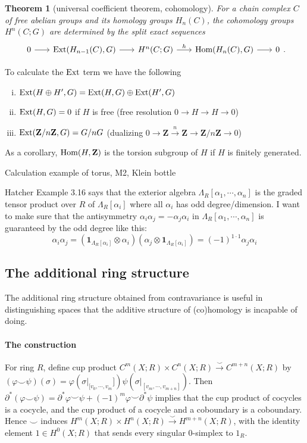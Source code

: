 \documentclass[11pt]{article}
\theoremstyle{definition}
\theoremstyle{plain}
\newtheorem{theorem}{Theorem}[section]
\newcommand{\Z}{\mathbf{Z}}
\newcommand{\Hom}{\textup{Hom}}
\newcommand{\Ext}{\textup{Ext}}
\newcommand{\1}{\mathbf{1}}
\begin{document}
\begin{theorem}[universal coefficient theorem, cohomology]
For a chain complex $C$ of free abelian groups and its homology groups $H_n(C)$, the cohomology groups $H^n(C;G)$ are determined by the split exact sequences
\begin{equation}\begin{tikzcd}[column sep=scriptsize]
0\arrow[r]&\Ext(H_{n-1}(C),G)\arrow[r]&H^n(C;G)\arrow{r}{h}&\Hom(H_n(C),G)\arrow[r]&0
\end{tikzcd}.\end{equation}
\end{theorem}

To calculate the $\Ext$ term we have the following\begin{enumerate}[(i)]
    \item $\Ext(H\oplus H',G)=\Ext(H,G)\oplus\Ext(H',G)$
    \item $\Ext(H,G)=0$ if $H$ is free (free resolution $0\rightarrow H\rightarrow H\rightarrow0$)
    \item $\Ext(\Z/n\Z,G)=G/nG$ (dualizing $0\rightarrow\Z\xrightarrow{n}\Z\rightarrow\Z/n\Z\rightarrow0$)
\end{enumerate}
As a corollary, $\Hom(H,\Z)$ is the torsion subgroup of $H$ if $H$ is finitely generated.

Calculation example of torus, M2, Klein bottle\bigbreak

Hatcher Example 3.16 says that the exterior algebra $\Lambda_R[\alpha_1,\cdots,\alpha_n]$ is the graded tensor product over $R$ of $\Lambda_R[\alpha_i]$ where all $\alpha_i$ has odd degree/dimension. I want to make sure that the antisymmetry $\alpha_i\alpha_j=-\alpha_j\alpha_i$ in $\Lambda_R[\alpha_1,\cdots,\alpha_n]$ is guaranteed by the odd degree like this:
\[\alpha_i\alpha_j=(\1_{\Lambda_R[\alpha_i]}\otimes\alpha_i)(\alpha_j\otimes\1_{\Lambda_R[\alpha_i]})=(-1)^{1\cdot1}\alpha_j\alpha_i\]

\newpage
\subsection{The additional ring structure}

The additional ring structure obtained from contravariance is useful in distinguishing spaces that the additive structure of (co)homology is incapable of doing.

\paragraph{The construction} For ring $R$, define cup product $C^m(X;R)\times C^n(X;R)\xrightarrow{\smile} C^{m+n}(X;R)$ by $(\varphi\smile\psi)(\sigma)=\varphi(\sigma|_{[v_0,\cdots,v_m}])\psi(\sigma|_{[v_m,\cdots,v_{m+n}]})$. Then $\partial^\ast(\varphi\smile\psi)=\partial^\ast\varphi\smile\psi+(-1)^m\varphi\smile\partial^\ast\psi$ implies that the cup product of cocycles is a cocycle, and the cup product of a cocycle and a coboundary is a coboundary. Hence $\smile$ induces $H^m(X;R)\times H^n(X;R)\xrightarrow{\smile}H^{m+n}(X;R)$, with the identity element $1\in H^0(X;R)$ that sends every singular $0$-simplex to $1_R$.
\end{document}
